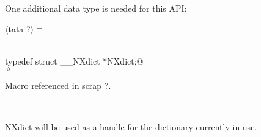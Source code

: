 \documentclass[12pt]{article}
\begin{document}
  One additional data type is needed for this API:
\begin{flushleft} \small
\begin{minipage}{\linewidth} \label{scrap1}
$\langle$tata {\footnotesize ?}$\rangle\equiv$
\vspace{-1ex}
\begin{list}{}{} \item
\mbox{}\verb@@\\
\mbox{}\verb@   typedef struct __NXdict *NXdict;@\\
\mbox{}\verb@@$\diamond$
\end{list}
\vspace{-1ex}
\footnotesize\addtolength{\baselineskip}{-1ex}
\begin{list}{}{\setlength{\itemsep}{-\parsep}\setlength{\itemindent}{-\leftmargin}}
\item Macro referenced in scrap ?.
\end{list}
\end{minipage}\\[4ex]
\end{flushleft}
NXdict will be used as a handle for the dictionary currently in use.
\end{document}
